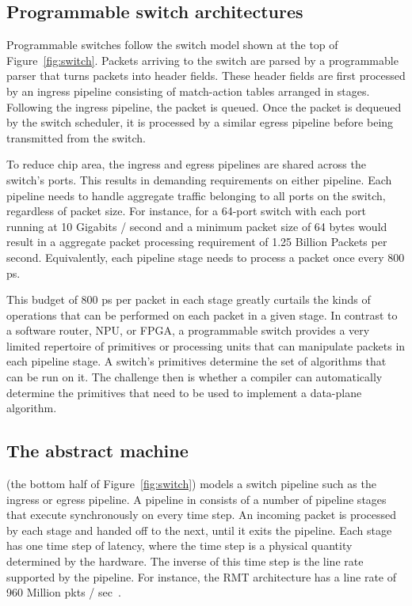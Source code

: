 \subsection{Programmable switch architectures}
Programmable switches follow the switch model shown at the top of
Figure~\ref{fig:switch}.  Packets arriving to the switch are parsed by a
programmable parser that turns packets into header fields. These header fields
are first processed by an ingress pipeline consisting of match-action tables
arranged in stages.  Following the ingress pipeline, the packet is queued. Once
the packet is dequeued by the switch scheduler, it is processed by a similar
egress pipeline before being transmitted from the switch.

To reduce chip area, the ingress and egress pipelines are shared across the
switch's ports. This results in demanding requirements on either pipeline.
Each pipeline needs to handle aggregate traffic belonging to all ports on the
switch, regardless of packet size. For instance, for a 64-port switch with each
port running at 10 Gigabits / second and a minimum packet size of 64 bytes
would result in a aggregate packet processing requirement of 1.25 Billion
Packets per second. Equivalently, each pipeline stage needs to process a packet
once every 800 ps.

This budget of 800 ps per packet in each stage greatly curtails the kinds of
operations that can be performed on each packet in a given stage. In contrast
to a software router, NPU, or FPGA, a programmable switch provides a very
limited repertoire of primitives or processing units that can manipulate
packets in each pipeline stage. A switch's primitives determine the set of
algorithms that can be run on it. The challenge then is whether a compiler can
automatically determine the primitives that need to be used to implement a
data-plane algorithm.

\subsection{The \absmachine abstract machine}

\absmachine (the bottom half of Figure~\ref{fig:switch}) models a switch
pipeline such as the ingress or egress pipeline. A pipeline in \absmachine
consists of a number of pipeline stages that execute synchronously on every
time step. An incoming packet is processed by each stage and handed off to the
next, until it exits the pipeline. Each stage has one time step of latency,
where the time step is a physical quantity determined by the hardware. The
inverse of this time step is the line rate supported by the pipeline. For
instance, the RMT architecture has a line rate of 960 Million pkts /
sec~\cite{rmt}.

